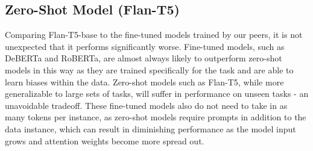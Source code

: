 \subsection{Zero-Shot Model (Flan-T5)}
Comparing Flan-T5-base to the fine-tuned models trained by our peers, it is not unexpected that it performs significantly worse.
Fine-tuned models, such as DeBERTa and RoBERTa, are almost always likely to outperform zero-shot models in this way as they are trained specifically for the task and are able to learn biases within the data.
Zero-shot models such as Flan-T5, while more generalizable to large sets of tasks, will suffer in performance on unseen tasks - an unavoidable tradeoff.
These fine-tuned models also do not need to take in as many tokens per instance, as zero-shot models require prompts in addition to the data instance, which can result in diminishing performance as the model input grows and attention weights become more spread out.